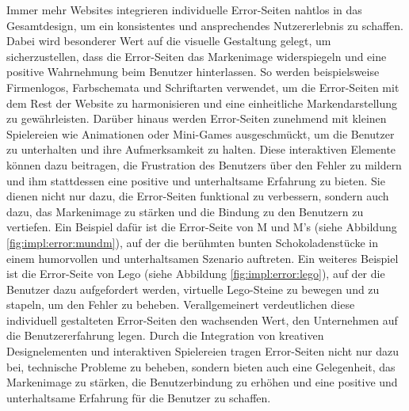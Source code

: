 Immer mehr Websites integrieren individuelle Error-Seiten nahtlos in das Gesamtdesign, um ein konsistentes und ansprechendes Nutzererlebnis zu schaffen. 
Dabei wird besonderer Wert auf die visuelle Gestaltung gelegt, um sicherzustellen, dass die Error-Seiten das Markenimage widerspiegeln und 
eine positive Wahrnehmung beim Benutzer hinterlassen. So werden beispielsweise Firmenlogos, Farbschemata und Schriftarten verwendet, um die 
Error-Seiten mit dem Rest der Website zu harmonisieren und eine einheitliche Markendarstellung zu gewährleisten.
Darüber hinaus werden Error-Seiten zunehmend mit kleinen Spielereien wie Animationen oder Mini-Games ausgeschmückt, um die Benutzer zu 
unterhalten und ihre Aufmerksamkeit zu halten. Diese interaktiven Elemente können dazu beitragen, die Frustration des Benutzers über den 
Fehler zu mildern und ihm stattdessen eine positive und unterhaltsame Erfahrung zu bieten. Sie dienen nicht nur dazu, die Error-Seiten 
funktional zu verbessern, sondern auch dazu, das Markenimage zu stärken und die Bindung zu den Benutzern zu vertiefen.
Ein Beispiel dafür ist die Error-Seite von M und M's (siehe Abbildung \ref{fig:impl:error:mundm}), auf der die berühmten bunten Schokoladenstücke 
in einem humorvollen und unterhaltsamen Szenario auftreten. Ein weiteres Beispiel ist die Error-Seite von Lego (siehe Abbildung 
\ref{fig:impl:error:lego}), auf der die Benutzer dazu aufgefordert werden, virtuelle Lego-Steine zu bewegen und zu stapeln, um den 
Fehler zu beheben.
Verallgemeinert verdeutlichen diese individuell gestalteten Error-Seiten den wachsenden Wert, den Unternehmen auf die Benutzererfahrung legen.
Durch die Integration von kreativen Designelementen und interaktiven Spielereien tragen Error-Seiten nicht nur dazu bei, technische Probleme 
zu beheben, sondern bieten auch eine Gelegenheit, das Markenimage zu stärken, die Benutzerbindung zu erhöhen und eine positive und unterhaltsame 
Erfahrung für die Benutzer zu schaffen. 

